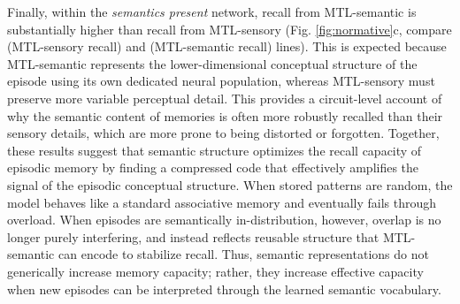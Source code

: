\documentclass{article}
\providecommand{\DIFaddtex}[1]{{\protect\color{blue}\uwave{#1}}} %
\providecommand{\DIFaddbegin}{} %
\providecommand{\DIFaddend}{} %
\providecommand{\DIFadd}[1]{\texorpdfstring{\DIFaddtex{#1}}{#1}} %
\begin{document}
\newline\newline
Finally, within the \textit{semantics present} network, recall from MTL-semantic is substantially higher than recall from MTL-sensory (Fig. \ref{fig:normative}c, compare  \DIFaddbegin \DIFadd{solid }\DIFaddend (MTL-sensory recall) and  \DIFaddbegin \DIFadd{dashed }\DIFaddend (MTL-semantic recall) lines). This is expected because MTL-semantic represents the lower-dimensional conceptual structure of the episode using its own dedicated neural population, whereas MTL-sensory must preserve more variable perceptual detail. This provides a circuit-level account of why the semantic content of memories is often more robustly recalled than their sensory details, which are more prone to being distorted or forgotten.
\newline\newline
Together, these results suggest that semantic structure optimizes the recall capacity of episodic memory by finding a compressed code that effectively amplifies the signal of the episodic conceptual structure. When stored patterns are random, the model behaves like a standard associative memory and eventually fails through overload. When episodes are semantically in-distribution, however, overlap is no longer purely interfering, and instead reflects reusable structure that MTL-semantic can encode to stabilize recall. Thus, semantic representations do not generically increase memory capacity; rather, they increase effective capacity when new episodes can be interpreted through the learned semantic vocabulary.
\end{document}
